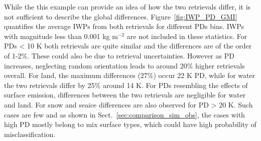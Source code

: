 \documentclass[amt, manuscript]{copernicus}
\begin{document}

While the this example can provide an idea of how the two retrievals differ, it is not sufficient to describe the global differences. Figure~\ref{fig:IWP_PD_GMI} quantifies the average IWPs from both retrievals for different PDs bins. IWPs with magnitude less than 0.001\,\,kg m$^{-2}$ are not included in these statistics. For PDs < 10\,\,K both retrievals are quite similar and the differences are of the order of 1-2\%. These could also be due to retrieval uncertainties. However as PD increases, neglecting random orientation leads to around 20\% higher retrievals overall. For land, the maximum differences (27\%) occur 22\,\,K PD, while for water the two retrievals differ by 25\% around 14\,\,K. For PDs resembling the effects of surface emission, differences between the two retrievals are negligible for water and land. For snow and seaice differences are also observed for PD > 20\,\,K.  Such cases are few and as shown in Sect.~\ref{sec:comparison_sim_obs}, the cases with high PD mostly belong to mix surface types, which could have high probability of misclassification.
\end{document}
